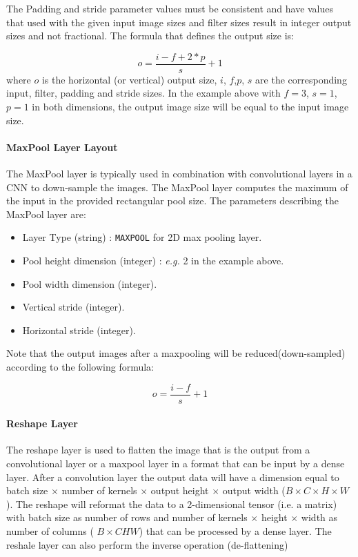 {  The Padding and stride parameter values must be consistent and have values that used with the given input image sizes and filter sizes result in integer output sizes and not fractional. 
  The formula that defines the output size is:
  
 \begin{equation}
    o = \frac{i - f + 2* p }{s} + 1
 \end{equation}
  where $o$ is the horizontal (or vertical) output size, $i$, $f$,$p$, $s$ are the corresponding input, filter, padding and stride sizes.
  In the example above with $f=3$, $s=1$,$p=1$ in both dimensions, the output image size will be equal to the input image size.

 \paragraph{MaxPool Layer Layout}

 The MaxPool layer is typically used in combination with convolutional layers in a CNN to down-sample the images.
 The MaxPool layer computes the maximum of the input in the provided rectangular pool size.
 The parameters describing the MaxPool layer are:
\begin{itemize}
\item Layer Type (string) :  {\tt MAXPOOL} for 2D max pooling layer.
\item Pool height dimension  (integer)  : {\it e.g.}  2 in the example above.
\item Pool width dimension  (integer).  
\item Vertical stride (integer).
\item Horizontal stride (integer).
\end{itemize}

Note that the output images after a maxpooling will be reduced(down-sampled) according to the following formula:

\begin{equation}
    o = \frac{i -f }{s} + 1
  \end{equation}
  
 \paragraph{Reshape Layer}

 The reshape layer is used to flatten the image that is the output from a convolutional layer or a maxpool layer in a format that can be input by a dense layer. After a convolution layer  the output
 data  will have a dimension equal to batch size $\times$ number of kernels $\times$ output height $\times$ output width ($B \times C \times H \times W$).  The reshape will reformat the data to a
 2-dimensional tensor (i.e. a matrix) with batch size as number of rows and 
 number of kernels $\times$ height $\times$ width as number of columns ( $B \times CHW$)  that can be processed by a dense layer.
 The reshale layer can also perform the inverse operation (de-flattening)

}
